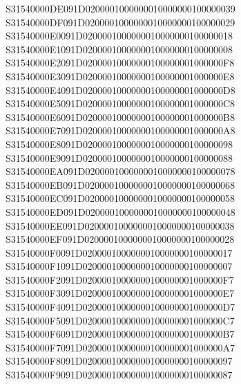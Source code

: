 \documentclass[12pt,a4paper]{article}
\begin{document}
\begin{framed}
{S31540000DE091D0200001000000010000000100000039\newline
S31540000DF091D0200001000000010000000100000029\newline
S31540000E0091D0200001000000010000000100000018\newline
S31540000E1091D0200001000000010000000100000008\newline
S31540000E2091D02000010000000100000001000000F8\newline
S31540000E3091D02000010000000100000001000000E8\newline
S31540000E4091D02000010000000100000001000000D8\newline
S31540000E5091D02000010000000100000001000000C8\newline
S31540000E6091D02000010000000100000001000000B8\newline
S31540000E7091D02000010000000100000001000000A8\newline
S31540000E8091D0200001000000010000000100000098\newline
S31540000E9091D0200001000000010000000100000088\newline
S31540000EA091D0200001000000010000000100000078\newline
S31540000EB091D0200001000000010000000100000068\newline
S31540000EC091D0200001000000010000000100000058\newline
S31540000ED091D0200001000000010000000100000048\newline
S31540000EE091D0200001000000010000000100000038\newline
S31540000EF091D0200001000000010000000100000028\newline
S31540000F0091D0200001000000010000000100000017\newline
S31540000F1091D0200001000000010000000100000007\newline
S31540000F2091D02000010000000100000001000000F7\newline
S31540000F3091D02000010000000100000001000000E7\newline
S31540000F4091D02000010000000100000001000000D7\newline
S31540000F5091D02000010000000100000001000000C7\newline
S31540000F6091D02000010000000100000001000000B7\newline
S31540000F7091D02000010000000100000001000000A7\newline
S31540000F8091D0200001000000010000000100000097\newline
S31540000F9091D0200001000000010000000100000087\newline
}
\end{framed}
\end{document}
